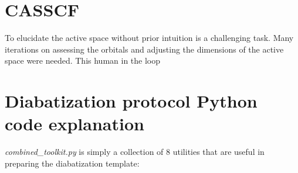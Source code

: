 \documentclass[letterpaper, 12pt, oneside]{report}
\begin{document}
\section{CASSCF}
    To elucidate the active space without prior intuition is a challenging task. Many iterations on assessing the orbitals and adjusting the dimensions of the active space were needed. This human in the loop
    
\section{Diabatization protocol Python code explanation}

\textit{combined\_toolkit.py} is simply a collection of 8 utilities that are useful in preparing the diabatization template:






\end{document}
